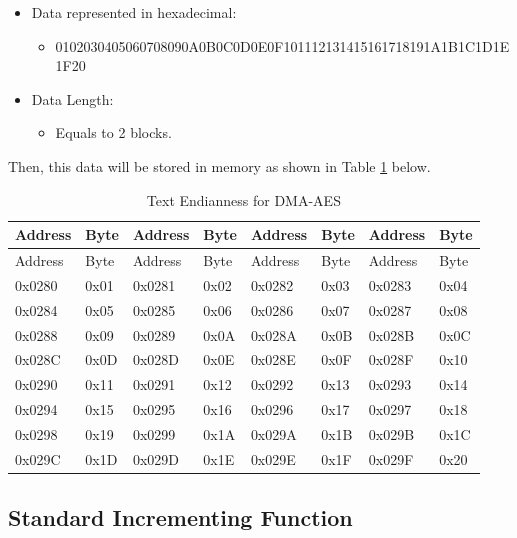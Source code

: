 \documentclass[main\_\_EN.tex]{subfiles}
\begin{document}
\begin{itemize}
    \item Data represented in hexadecimal: 
    \begin{itemize}
    \item 0102030405060708090A0B0C0D0E0F101112131415161718191A1B1C1D1E1F20 
    \end{itemize}
\item Data Length: 
    \begin{itemize}
    \item Equals to 2 blocks.
    \end{itemize}
\end{itemize}

Then, this data will be stored in memory as shown in Table \ref{tab:aes-dma-aes-plaintext-ciphertext-endian} below. 

\begin{longtable}[c]
{ | l | l |l | l | l | l | l | l |}
\caption{Text Endianness for DMA-AES} 
\label{tab:aes-dma-aes-plaintext-ciphertext-endian}\\
\hline 
\rowcolor{lightgray}
Address &  Byte  & Address &  Byte  & Address &  Byte  & Address &  Byte \\\hline
\endfirsthead
\hline
\rowcolor{lightgray}
Address &  Byte  & Address &  Byte  & Address &  Byte  & Address &  Byte \\\hline
\endhead
\endfoot
0x0280 & 0x01 & 0x0281 & 0x02 & 0x0282 & 0x03 & 0x0283 & 0x04 \\\hline 
0x0284 & 0x05 & 0x0285 & 0x06 & 0x0286 & 0x07 & 0x0287 & 0x08 \\\hline 
0x0288 & 0x09 & 0x0289 & 0x0A & 0x028A & 0x0B & 0x028B & 0x0C \\\hline 
0x028C & 0x0D & 0x028D & 0x0E & 0x028E & 0x0F & 0x028F & 0x10 \\\hline 
0x0290 & 0x11 & 0x0291 & 0x12 & 0x0292 & 0x13 & 0x0293 & 0x14 \\\hline 
0x0294 & 0x15 & 0x0295 & 0x16 & 0x0296 & 0x17 & 0x0297 & 0x18 \\\hline 
0x0298 & 0x19 & 0x0299 & 0x1A & 0x029A & 0x1B & 0x029B & 0x1C \\\hline 
0x029C & 0x1D & 0x029D & 0x1E & 0x029E & 0x1F & 0x029F & 0x20 \\\hline  
\end{longtable}
\subsection{Standard Incrementing Function}\label{sec:aes-Standard-Incrementing-Function}
\end{document}
